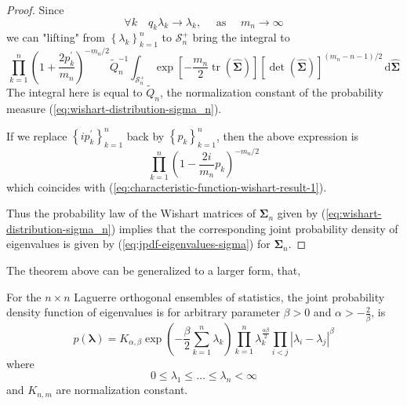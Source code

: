 \begin{proof}
    Since
    \begin{equation*}
        \forall k\quad q_{k}\lambda_{k}\rightarrow\lambda_{k},\quad\text{ as }\quad m_{n}\rightarrow\infty
    \end{equation*}
    we can "lifting" from $\left\{\lambda_{k}\right\}_{k=1}^{n}$ to $\mathcal{S}_{n}^{+}$ bring the integral to
    \begin{equation*}
        \prod_{k=1}^{n}\left(1+\frac{2p_{k}^{\prime}}{m_{n}}\right)^{-m_{n}/2}\widetilde{Q}_{n}^{-1}\int_{\mathcal{S}_{n}^{+}}\exp\left[-\frac{m_{n}}{2}\operatorname{tr}\left(\widehat{\boldsymbol{\Sigma}}\right)\right]\left[\operatorname{det}\left(\widehat{\boldsymbol{\Sigma}}\right)\right]^{(m_{n}-n-1)/2}\,\mathrm{d}\widehat{\boldsymbol{\Sigma}}
    \end{equation*}
    The integral here is equal to $\widetilde{Q}_{n}$, the normalization constant of the probability measure (\ref{eq:wishart-distribution-sigma_n}).

    If we replace $\left\{i p_{k}^{\prime}\right\}_{k=1}^{n}$ back by $\left\{p_{k}\right\}_{k=1}^{n}$, then the above expression is
    \begin{equation*}
        \prod_{k=1}^{n}\left(1-\frac{2i}{m_n}p_{k}\right)^{-m_{n}/2}
    \end{equation*}
    which coincides with (\ref{eq:characteristic-function-wishart-result-1}).

    Thus the probability law of the Wishart matrices of $\boldsymbol{\Sigma}_n$ given by (\ref{eq:wishart-distribution-sigma_n}) implies that the corresponding joint probability density of eigenvalues is given by (\ref{eq:jpdf-eigenvalues-sigma}) for $\boldsymbol{\Sigma}_n$.
\end{proof}

The theorem above can be generalized to a larger form, that,
\begin{definition}
    For the $n\times n$ Laguerre orthogonal ensembles of statistics, the joint probability density function of eigenvalues is
    for arbitrary parameter $\beta>0$ and $\alpha>-\frac{2}{\beta}$, is
    \begin{equation}
        p\left(\boldsymbol{\lambda}\right)=K_{\alpha,\beta}\exp\left(-\frac{\beta}{2}\sum_{k=1}^{n}\lambda_{k}\right)\prod_{k=1}^{n} \lambda_{k}^{\frac{\alpha\beta}{2}}\prod_{i<j}\left|\lambda_{i}-\lambda_{j}\right|^{\beta}
        \label{eq:laguerre-orthogonal-ensemble}
    \end{equation}
    where
    \begin{equation*}
        0\leq\lambda_{1}\leq\ldots\leq\lambda_{n}<\infty
    \end{equation*}
    and $K_{n,m}$ are normalization constant.
\end{definition}

